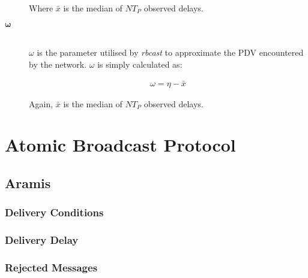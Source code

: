 \begin{description}
Where $\bar{x}$ is the median of $NT_P$ observed delays.

        \item[\Huge$\boldsymbol{\omega}$] \hfill \\
        $\omega$ is the parameter utilised by \emph{rbcast} to approximate the PDV encountered by the network.  $\omega$ is simply calculated as:
        
        \begin{equation*}
		    \begin{aligned}
		        \omega = \eta - \bar{x}
		    \end{aligned}
		\end{equation*}        
        
        Again, $\bar{x}$ is the median of $NT_P$ observed delays.
        \end{description}

	    
\section{Atomic Broadcast Protocol}

    \subsection{Aramis}
    
	    \subsubsection{Delivery Conditions}    
	    
		\subsubsection{Delivery Delay}
		\subsubsection{Rejected Messages}
		
